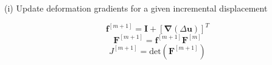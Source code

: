 \documentclass[sn-mathphys,Numbered]{sn-jnl}%
\newcommand{\bb}{\boldsymbol}
\begin{document}

\begin{algorithm}[htbp] \label{alg:GTN} \footnotesize
\SetAlgoLined
(i) Update deformation gradients for a given incremental displacement

\begin{equation}
  \bb{f}^{[m+1]} = \bb{I} + \left[ \bb{\nabla}(\Delta\textbf{u}) \right]^T \nonumber
\end{equation}
\begin{equation}
  \bb{F}^{[m+1]} = \bb{f}^{[m+1]} \bb{F}^{[m]}  \nonumber
\end{equation}
\begin{equation}
  J^{[m+1]} = \text{det} \left( \bb{F}^{[m+1]} \right) \nonumber
\end{equation}


\end{algorithm}
\end{document}
